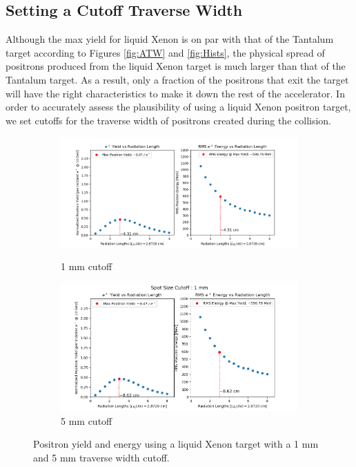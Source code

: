 \documentclass[%
reprint,
amsmath, amssymb,
aps,
floatfix,
]{revtex4-2}
\begin{document}
\subsection{Setting a Cutoff Traverse Width}
Although the max yield for liquid Xenon is on par with that of the Tantalum target
according to Figures \ref{fig:ATW} and \ref{fig:Hists}, the physical spread of positrons produced
from the liquid Xenon target is much larger than that of the Tantalum target.  As a result, only a
fraction of the positrons that exit the target will have the right characteristics to make it down the rest of
the accelerator.  In order to accurately assess the plausibility of using a liquid Xenon positron target,
we set cutoffs for the traverse width of positrons created during the collision.

\begin{figure}[H]
    \begin{subfigure}{.45\textwidth}
        \includegraphics[height = .43\linewidth]{../images/XeYield1mmCutoff.png}
        \caption{\label{fig:XeY1}1 mm cutoff}
        \includegraphics[height = .43\linewidth]{../images/XeYield5mmCutoff.png}
        \caption{\label{fig:XeY5}5 mm cutoff}
    \end{subfigure}
    \caption{\label{fig:YieldCut}Positron yield and energy using 
    a liquid Xenon target with a 1 mm and 5 mm traverse width cutoff.}
\end{figure}
\end{document}
